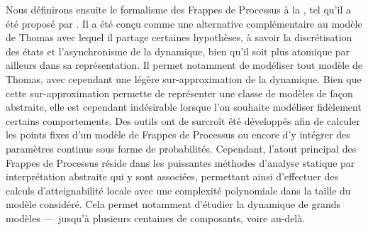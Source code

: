 Nous définirons ensuite le formalisme des Frappes de Processus
à la , tel qu'il a été proposé par .
Il a été conçu comme une alternative complémentaire au modèle de Thomas
avec lequel il partage certaines hypothèses, à savoir la discrétisation des états
et l'asynchronisme de la dynamique,
bien qu'il soit plus atomique par ailleurs dans sa représentation.
Il permet notamment de modéliser tout modèle de Thomas,
avec cependant une légère sur-approximation de la dynamique.
Bien que cette sur-approximation permette de représenter une classe de modèles de façon
abstraite, elle est cependant indésirable lorsque l'on souhaite modéliser
fidèlement certains comportements.
Des outils ont de surcroît été développés afin de calculer les points fixes d'un modèle de
Frappes de Processus ou encore d'y intégrer des paramètres continus
sous forme de probabilités.
Cependant, l'atout principal des Frappes de Processus réside dans les puissantes
méthodes d'analyse statique par interprétation abstraite qui y sont associées,
permettant ainsi d'effectuer des calculs d'atteignabilité locale
avec une complexité polynomiale dans la taille du modèle considéré.
Cela permet notamment d'étudier la dynamique de grands modèles
---~jusqu'à plusieurs centaines de composants, voire au-delà.







